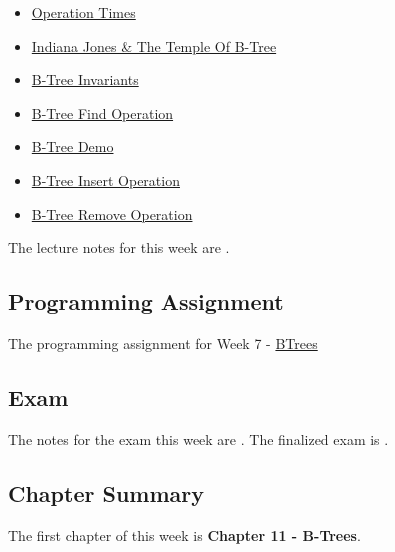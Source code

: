 \begin{itemize}
    \item \href{https://applied.cs.colorado.edu/mod/hvp/view.php?id=45970}{Operation Times}
    \item \href{https://applied.cs.colorado.edu/mod/hvp/view.php?id=45971}{Indiana Jones \& The Temple Of B-Tree}
    \item \href{https://applied.cs.colorado.edu/mod/hvp/view.php?id=45972}{B-Tree Invariants}
    \item \href{https://applied.cs.colorado.edu/mod/hvp/view.php?id=45973}{B-Tree Find Operation}
    \item \href{https://applied.cs.colorado.edu/mod/hvp/view.php?id=45974}{B-Tree Demo}
    \item \href{https://applied.cs.colorado.edu/mod/hvp/view.php?id=45975}{B-Tree Insert Operation}
    \item \href{https://applied.cs.colorado.edu/mod/hvp/view.php?id=45976}{B-Tree Remove Operation}
\end{itemize}
The lecture notes for this week are .

\subsection{Programming Assignment}

The programming assignment for Week 7 - \href{https://github.com/QuantumCompiler/CU/tree/main/CSPB%202270%20-%20Data%20Structures/CSPB%202270%20-%20Programming%20Assignments/CSPB%202270%20-%20Assignment%205%20-%20B-Trees}{BTrees}

\subsection{Exam}

The notes for the exam this week are . The finalized exam is .

\subsection{Chapter Summary}

The first chapter of this week is \textbf{Chapter 11 - B-Trees}.

